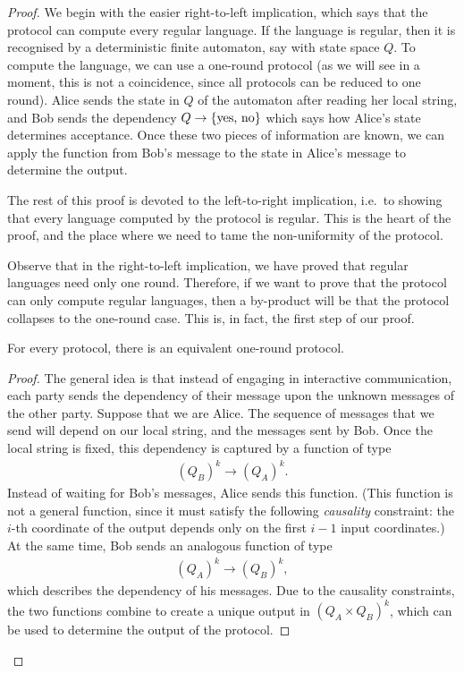 \begin{proof}
  We begin with the easier right-to-left implication, which says that the protocol can compute every regular language. If the language is  regular, then it  is recognised by a deterministic finite automaton, say  with state space $Q$. To compute the language, we can use a  one-round protocol (as we will see in a moment, this is not a coincidence, since all protocols can be reduced to one round). Alice sends the state in $Q$ of the automaton after reading her local string, and Bob sends the dependency $Q \to \{\text{yes, no}\}$ which says how Alice's state determines acceptance. Once these two pieces of information are known, we can apply the function from Bob's message to the state in Alice's message to determine the output.

  The rest of this proof is devoted to the left-to-right implication, i.e.~to showing that every language computed by the protocol is regular. This is the heart of the proof, and the place where we need to tame the non-uniformity of the protocol. 
  
  Observe that in the right-to-left implication, we have proved that regular languages need only one round. Therefore, if we want to  prove that the protocol can only compute regular languages, then a by-product will be that the protocol collapses to the one-round case.  This is, in fact, the first step of our proof. 
  \begin{lemma}\label{lem:one-round-reduction-boolean}
    For every protocol, there is an equivalent one-round protocol. 
  \end{lemma}
  \begin{proof}
    The general idea is that instead of engaging in interactive communication, each party sends the dependency of their message upon the unknown messages of the other party. Suppose that we are  Alice. The sequence of messages that we send will depend on our local string, and  the messages sent by Bob. Once the local string is fixed, this dependency is captured by a function of type 
    \begin{align*}
    (Q_B)^k \to (Q_A)^k.
    \end{align*}
    Instead of waiting for Bob's messages, Alice sends this function. (This function is not a general function, since it must satisfy the following \emph{causality} constraint: the $i$-th coordinate of the output depends only on the first $i-1$ input coordinates.) At the same time, Bob sends an analogous function of type 
    \begin{align*}
    (Q_A)^k \to (Q_B)^k,
    \end{align*}
    which describes the dependency of his messages. Due to the causality constraints, the two functions combine to create a unique output in $(Q_A \times Q_B)^k$, which can be used to determine the output of the protocol.
  \end{proof}


\end{proof}
